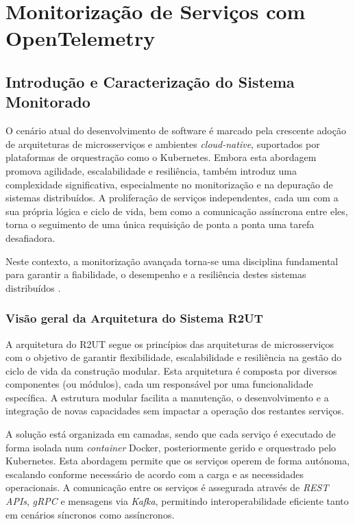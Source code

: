 
\chapter{Monitorização de Serviços com OpenTelemetry}

\section{Introdução e Caracterização do Sistema Monitorado}

O cenário atual do desenvolvimento de software é marcado pela crescente adoção de arquiteturas de microsserviços e ambientes \textit{cloud-native}, suportados por plataformas de orquestração como o Kubernetes. Embora esta abordagem promova agilidade, escalabilidade e resiliência, também introduz uma complexidade significativa, especialmente no monitorização e na depuração de sistemas distribuídos. A proliferação de serviços independentes, cada um com a sua própria lógica e ciclo de vida, bem como a comunicação assíncrona entre eles, torna o seguimento de uma única requisição de ponta a ponta uma tarefa desafiadora.

Neste contexto, a monitorização avançada torna-se uma disciplina fundamental para garantir a fiabilidade, o desempenho e a resiliência destes sistemas distribuídos \cite{Salah2017}.


\subsection{Visão geral da Arquitetura do Sistema R2UT}

A arquitetura do R2UT segue os princípios das arquiteturas de microsserviços com o objetivo de garantir flexibilidade, escalabilidade e resiliência na gestão do ciclo de vida da construção modular. Esta arquitetura é composta por diversos componentes (ou módulos), cada um responsável por uma funcionalidade específica. A estrutura modular facilita a manutenção, o desenvolvimento e a integração de novas capacidades sem impactar a operação dos restantes serviços.

A solução está organizada em camadas, sendo que cada serviço é executado de forma isolada num \textit{container} Docker, posteriormente gerido e orquestrado pelo Kubernetes. Esta abordagem permite que os serviços operem de forma autónoma, escalando conforme necessário de acordo com a carga e as necessidades operacionais. A comunicação entre os serviços é assegurada através de \textit{REST APIs}, \textit{gRPC} e mensagens via \textit{Kafka}, permitindo interoperabilidade eficiente tanto em cenários síncronos como assíncronos.

